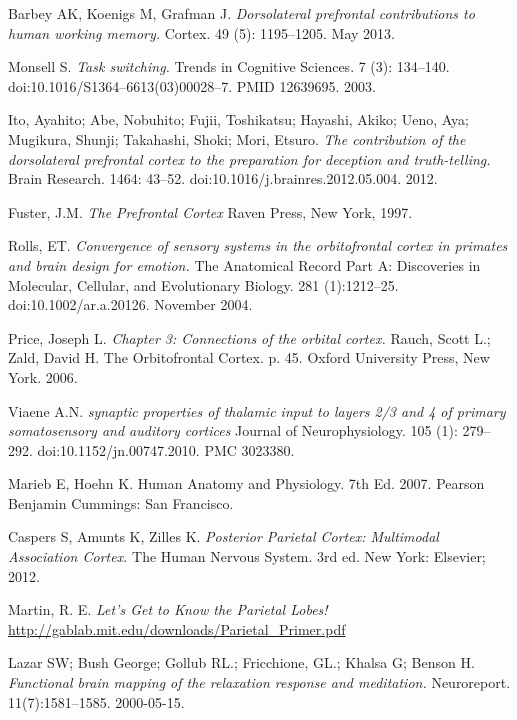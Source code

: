 \documentclass[a4paper, amsfonts, amssymb, amsmath, reprint, showkeys, nofootinbib, twoside]{revtex4-1}
\begin{document}
\begin{thebibliography}{99}
  Barbey AK, Koenigs M, Grafman J.
  \textit{Dorsolateral prefrontal contributions to human working memory.}
  Cortex. 49 (5): 1195–1205. May 2013.

  Monsell S.
  \textit{Task switching.}
  Trends in Cognitive Sciences. 7 (3):
  134–140. doi:10.1016/S1364–6613(03)00028–7. PMID 12639695. 2003.

  Ito, Ayahito; Abe, Nobuhito; Fujii, Toshikatsu; Hayashi, Akiko; Ueno, Aya;
  Mugikura, Shunji; Takahashi, Shoki; Mori, Etsuro.
  \textit{The contribution of the dorsolateral prefrontal cortex to the preparation
    for deception and truth-telling.}
  Brain Research. 1464: 43–52. doi:10.1016/j.brainres.2012.05.004. 2012.

  Fuster, J.M.
  \textit{The Prefrontal Cortex}
  Raven Press, New York, 1997.

  Rolls, ET.
  \textit{Convergence of sensory systems in the orbitofrontal
    cortex in primates and brain design for emotion.}
  The Anatomical Record Part A: Discoveries in Molecular, Cellular, and Evolutionary
  Biology. 281 (1):1212–25. doi:10.1002/ar.a.20126. November 2004.

  Price, Joseph L.
  \textit{Chapter 3: Connections of the orbital cortex.}
  Rauch, Scott L.; Zald, David H.
  The Orbitofrontal Cortex. p. 45.
  Oxford University Press, New York. 2006.

  Viaene A.N. 
  \textit {synaptic properties of thalamic input to layers 2/3 and 4 of 
              primary somatosensory and auditory cortices}
  Journal of Neurophysiology. 105 (1): 279–292. 
  doi:10.1152/jn.00747.2010. PMC 3023380.

  Marieb E, Hoehn K. 
  Human Anatomy and Physiology. 
  7th Ed. 2007. Pearson Benjamin Cummings: San Francisco.

  Caspers S, Amunts K, Zilles K. 
  \textit {Posterior Parietal Cortex: Multimodal Association Cortex.}
   The Human Nervous System. 3rd ed. New York: Elsevier; 2012.

  Martin, R. E.
  \textit{Let’s Get to Know the Parietal Lobes!}
  \url{http://gablab.mit.edu/downloads/Parietal_Primer.pdf}

  Lazar SW; Bush George; Gollub RL.; Fricchione, GL.; Khalsa G; Benson H.
  \textit{Functional brain mapping of the relaxation response and meditation.}
  Neuroreport. 11(7):1581–1585. 2000-05-15.


\end{thebibliography}
\end{document}
